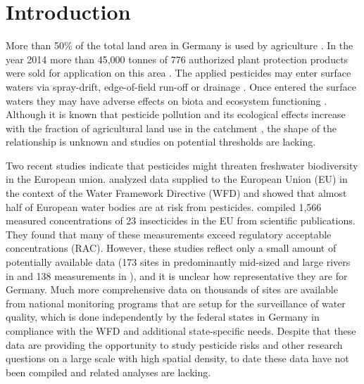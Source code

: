 \documentclass[journal=esthag,manuscript=article]{achemso}
\begin{document}


\section{Introduction}
More than 50\% of the total land area in Germany is used by agriculture \citep{statistisches_bundesamt_bodenflache_2014}.
In the year 2014 more than 45,000 tonnes of 776 authorized plant protection products were sold for application on this area \citep{bundesamt_fur_verbraucherschutz_und_lebensmittelsicherheit_absatz_2015}.
The applied pesticides may enter surface waters via spray-drift, edge-of-field run-off or drainage \citep{stehle_probabilistic_2013,schulz_comparison_2001,liess_determination_1999}.
Once entered the surface waters they may have adverse effects on biota and ecosystem functioning \citep{schafer_thresholds_2012}. 
Although it is known that pesticide pollution and its ecological effects increase with the fraction of agricultural land use in the catchment \citep{schulz_field_2004}, the shape of the relationship is unknown and studies on potential thresholds are lacking.

Two recent studies indicate that pesticides might threaten freshwater biodiversity in the European union.
\citet{malaj_organic_2014} analyzed data supplied to the European Union (EU) in the context of the Water Framework Directive (WFD) and showed that almost half of European water bodies are at risk from pesticides.
\citet{stehle_pesticide_2015} compiled 1,566 measured concentrations of 23 insecticides in the EU from scientific publications. 
They found that many of these measurements exceed regulatory acceptable concentrations (RAC).
However, these studies reflect only a small amount of potentially available data (173 sites in predominantly mid-sized and large rivers in \citet{malaj_organic_2014} and 138 measurements in \citet{stehle_pesticide_2015}), and it is unclear how representative they are for Germany. %
Much more comprehensive data on thousands of sites are available from national monitoring programs that are setup for the surveillance of water quality,
which is done independently by the federal states in Germany in compliance with the WFD \citep{quevauviller_water_2008} and additional state-specific needs. 
Despite that these data are providing the opportunity to study pesticide risks and other research questions on a large scale with high spatial density, to date these data have not been compiled and related analyses are lacking. 
\end{document}
